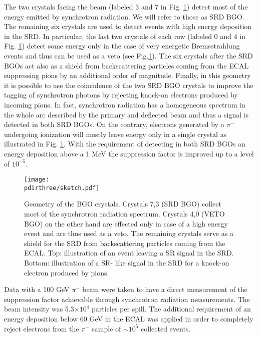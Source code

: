 The two crystals facing the beam (labeled 3 and 7 in Fig. \ref{fig:newgeo}) detect most of the energy emitted by synchrotron radiation. We will refer to those as SRD BGO. The remaining six crystals are used to detect events with high energy deposition in the SRD. In particular, the last two crystals of each row (labeled 0 and 4 in Fig. \ref{fig:newgeo}) detect some energy only in the case of very energetic Bremsstrahlung events and thus can be used as a veto (see Fig.\ref{fig:newgeo}). The six crystals after the SRD BGOs act also as a shield from backscattering particles coming from the ECAL suppressing pions by an additional order of magnitude. Finally, in this geometry it is possible to use the coincidence of the two SRD BGO crystals to improve the tagging of synchrotron photons by rejecting knock-on electrons produced by incoming pions. In fact, synchrotron radiation has a homogeneous spectrum in the whole arc described by the primary and deflected beam and thus a signal is detected in both SRD BGOs. On the contrary, electrons generated by a $\pi^-$ undergoing ionization will mostly leave energy only in a single crystal as illustrated in Fig. \ref{fig:newgeo}. 
With the requirement of detecting in both SRD BGOs an energy deposition above a 1 MeV the suppression factor is improved up to a level of $10^{-5}$.



\begin{figure}[htb!]
  \centering
  \texttt{[image: \\pdirthree/sketch.pdf]}
  \caption[Geometry of the BGO crystals]{Geometry of the BGO crystals. Crystals 7,3 (SRD BGO) collect most of the synchrotron radiation spectrum. Crystals 4,0 (VETO BGO) on the other hand are effected only in case of a high energy event and are thus used as a veto. The remaining crystals serve as a shield for the SRD from backscattering particles coming from the ECAL. Top: illustration of an event leaving a SR signal in the SRD. Bottom: illustration of a SR- like signal in the SRD for a knock-on electron produced by pions.}
\label{fig:newgeo}
\end{figure}

Data with a 100 GeV $\pi^-$ beam were taken to have a direct measurement of the suppression factor achievable through synchrotron radiation measurements. The beam intensity was 5.3$\times 10^4$ particles per spill. The additional requirement of an energy deposition below 60 GeV in the ECAL was applied in order to completely reject electrons from the $\pi^-$ sample of $\sim 10^5$ collected events.

